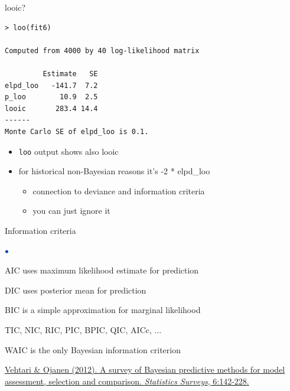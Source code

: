 \documentclass[english,t]{beamer}
\newenvironment{list1}{
   \begin{list}{$\color{list1}\bullet$}{\itemsep=6pt}}{
  \end{list}}
\begin{document}
\begin{frame}[fragile]{looic?}

{\scriptsize
\begin{lstlisting}
> loo(fit6)

Computed from 4000 by 40 log-likelihood matrix

         Estimate   SE
elpd_loo   -141.7  7.2
p_loo        10.9  2.5
looic       283.4 14.4
------
Monte Carlo SE of elpd_loo is 0.1.
\end{lstlisting}}

  \begin{itemize}
  \item \texttt{loo} output shows also {looic}
  \item for historical non-Bayesian reasons it's -2 * elpd\_loo
    \begin{itemize}
      \item connection to deviance and information criteria
      \item you can just ignore it
    \end{itemize}

  \end{itemize}
  
\end{frame}

\begin{frame}{Information criteria}

\begin{list1}
  \item<+-> AIC uses maximum likelihood estimate for prediction
  \item<+-> DIC uses posterior mean for prediction
  \item<+-> BIC is a simple approximation for marginal likelihood
  \item<+-> TIC, NIC, RIC, PIC, BPIC, QIC, AICc, ...
  \item<+-> WAIC is the only Bayesian information criterion
\end{list1}

\vspace{7\baselineskip}
{\color{gray}\footnotesize\href{http://dx.doi.org/10.1214/12-SS102}{Vehtari \& Ojanen (2012). A survey of Bayesian predictive methods for model assessment, selection and comparison. \textit{Statistics Surveys}, 6:142-228.}}
\end{frame}
\end{document}
